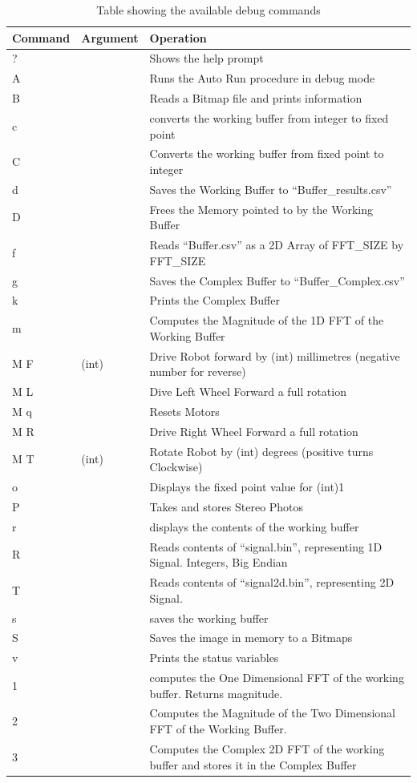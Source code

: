 \begin{table}
\centering
\caption{Table showing the available debug commands}
\label{table:Debug}
\begin{tabular}{llp{10cm}}\toprule
\textbf{Command} & \textbf{Argument} & \textbf{Operation} \\\toprule
? && Shows the help prompt\\ \midrule
A && Runs the Auto Run procedure in debug mode\\ \midrule
B && Reads a Bitmap file and prints information \\ \midrule
c && converts the working buffer from integer to fixed point\\\midrule
C && Converts the working buffer from fixed point to integer\\\midrule
d && Saves the Working Buffer to ``Buffer\_results.csv'' \\ \midrule
D && Frees the Memory pointed to by the Working Buffer \\ \midrule
f && Reads ``Buffer.csv'' as a 2D Array of FFT\_SIZE by FFT\_SIZE\\ \midrule
g && Saves the Complex Buffer to ``Buffer\_Complex.csv'' \\\midrule
k && Prints the Complex Buffer \\ \midrule
m && Computes the Magnitude of the 1D FFT of the Working Buffer \\\midrule
M F &(int) & Drive Robot forward by (int) millimetres (negative number for reverse)\\\midrule
M L && Dive Left Wheel Forward a full rotation \\\midrule
M q && Resets Motors \\\midrule
M R && Drive Right Wheel Forward a full rotation \\\midrule
M T &(int) & Rotate Robot by (int) degrees (positive turns Clockwise)\\\midrule
o && Displays the fixed point value for (int)1 \\\midrule
P && Takes and stores Stereo Photos \\ \midrule
r && displays the contents of the working buffer\\\midrule
R && Reads contents of ``signal.bin'', representing 1D Signal. Integers, Big Endian\\\midrule
T && Reads contents of ``signal2d.bin'', representing 2D Signal. \\ \midrule
s && saves the working buffer\\\midrule
S && Saves the image in memory to a Bitmaps \\\midrule
v && Prints the status variables \\ \midrule
1 && computes the One Dimensional FFT of the working buffer. Returns magnitude.\\\midrule
2 && Computes the Magnitude of the Two Dimensional FFT of the Working Buffer. \\ \midrule
3 && Computes the Complex 2D FFT of the working buffer and stores it in the Complex Buffer \\ \bottomrule
\end{tabular}
\end{table}

